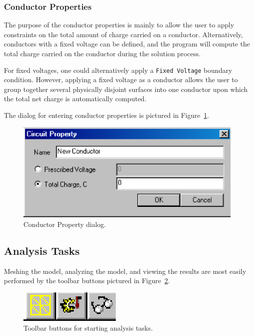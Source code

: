 \documentclass[12pt]{report}
\begin{document}
\subsubsection{Conductor Properties}

The purpose of the conductor properties is mainly to allow the user to apply
constraints on the total amount of charge carried on a conductor.
Alternatively, conductors with a fixed voltage can be defined, and the
program will compute the total charge carried on the conductor during the
solution process.





For fixed voltages, one could alternatively apply a \texttt{Fixed
Voltage} boundary condition. However, applying a fixed voltage as a
conductor allows the user to group together several physically
disjoint surfaces into one conductor upon which the total net
charge is automatically computed.





The dialog for entering conductor properties is pictured in
Figure~\ref{fig12}.

\begin{figure}[htbp]
\centerline{\includegraphics{belaman12.eps}}
\caption{Conductor Property dialog.}
\label{fig12}
\end{figure}

\subsection{Analysis Tasks}

Meshing the model, analyzing the model, and viewing the results are
most easily performed by the toolbar buttons pictured in
Figure~\ref{fig13}.

\begin{figure}[htbp]
\centerline{\includegraphics{belaman13.eps}}
\caption{Toolbar buttons for starting analysis tasks.}
\label{fig13}
\end{figure}
\end{document}

